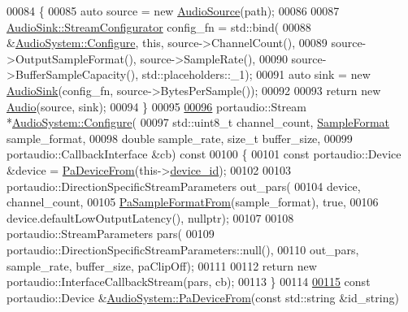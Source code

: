 \begin{DoxyCode}
00084 \textcolor{keyword}{}\{
00085     \textcolor{keyword}{auto} source = \textcolor{keyword}{new} \hyperlink{classAudioSource}{AudioSource}(path);
00086 
00087     \hyperlink{classAudioSink_ae5b8370aa17c24c6fc8f8e0c5778168c}{AudioSink::StreamConfigurator} config\_fn = std::bind(
00088                     &\hyperlink{classAudioSystem_a78e8754440e0a29f5fac9ca1cd79a109}{AudioSystem::Configure}, \textcolor{keyword}{this}, source->ChannelCount(),
00089                     source->OutputSampleFormat(), source->SampleRate(),
00090                     source->BufferSampleCapacity(), std::placeholders::\_1);
00091     \textcolor{keyword}{auto} sink = \textcolor{keyword}{new} \hyperlink{classAudioSink}{AudioSink}(config\_fn, source->BytesPerSample());
00092 
00093     \textcolor{keywordflow}{return} \textcolor{keyword}{new} \hyperlink{classAudio}{Audio}(source, sink);
00094 \}
00095 
\hypertarget{audio__system_8cpp_source_l00096}{}\hyperlink{classAudioSystem_a78e8754440e0a29f5fac9ca1cd79a109}{00096} portaudio::Stream *\hyperlink{classAudioSystem_a78e8754440e0a29f5fac9ca1cd79a109}{AudioSystem::Configure}(
00097                 std::uint8\_t channel\_count, \hyperlink{sample__formats_8hpp_a21cca244e782ff3acc8805fb73236772}{SampleFormat} sample\_format,
00098                 \textcolor{keywordtype}{double} sample\_rate, \textcolor{keywordtype}{size\_t} buffer\_size,
00099                 portaudio::CallbackInterface &cb)\textcolor{keyword}{ const}
00100 \textcolor{keyword}{}\{
00101     \textcolor{keyword}{const} portaudio::Device &device = \hyperlink{classAudioSystem_a513a0de4748574e25cba443f28949a90}{PaDeviceFrom}(this->\hyperlink{classAudioSystem_a3071e6d8643b3d0275ba63820e6e0072}{device\_id});
00102 
00103     portaudio::DirectionSpecificStreamParameters out\_pars(
00104                     device, channel\_count,
00105                     \hyperlink{classAudioSystem_aac640b14ad80c2518539bcafe9f4b5ac}{PaSampleFormatFrom}(sample\_format), \textcolor{keyword}{true},
00106                     device.defaultLowOutputLatency(), \textcolor{keyword}{nullptr});
00107 
00108     portaudio::StreamParameters pars(
00109                     portaudio::DirectionSpecificStreamParameters::null(),
00110                     out\_pars, sample\_rate, buffer\_size, paClipOff);
00111 
00112     \textcolor{keywordflow}{return} \textcolor{keyword}{new} portaudio::InterfaceCallbackStream(pars, cb);
00113 \}
00114 
\hypertarget{audio__system_8cpp_source_l00115}{}\hyperlink{classAudioSystem_a513a0de4748574e25cba443f28949a90}{00115} \textcolor{keyword}{const} portaudio::Device &\hyperlink{classAudioSystem_a513a0de4748574e25cba443f28949a90}{AudioSystem::PaDeviceFrom}(\textcolor{keyword}{const} std::string &id\_string)\textcolor{keyword}{}

\end{DoxyCode}
